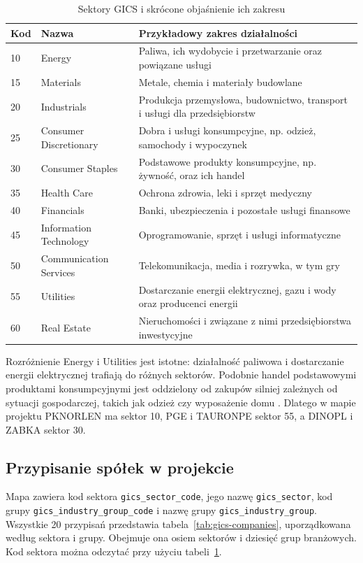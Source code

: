 \documentclass[12pt,a4paper,twoside]{report}
\begin{document}
\begin{table}[htbp]
\centering
\caption{Sektory GICS i skrócone objaśnienie ich zakresu}
\label{tab:gics-sectors}
\small
\begin{tabularx}{\textwidth}{p{0.8cm}XX}
\toprule
Kod & Nazwa & Przykładowy zakres działalności \\
\midrule
10 & Energy & Paliwa, ich wydobycie i przetwarzanie oraz powiązane usługi \\
15 & Materials & Metale, chemia i materiały budowlane \\
20 & Industrials & Produkcja przemysłowa, budownictwo, transport i usługi dla przedsiębiorstw \\
25 & Consumer Discretionary & Dobra i usługi konsumpcyjne, np. odzież, samochody i wypoczynek \\
30 & Consumer Staples & Podstawowe produkty konsumpcyjne, np. żywność, oraz ich handel \\
35 & Health Care & Ochrona zdrowia, leki i sprzęt medyczny \\
40 & Financials & Banki, ubezpieczenia i pozostałe usługi finansowe \\
45 & Information Technology & Oprogramowanie, sprzęt i usługi informatyczne \\
50 & Communication Services & Telekomunikacja, media i rozrywka, w tym gry \\
55 & Utilities & Dostarczanie energii elektrycznej, gazu i wody oraz producenci energii \\
60 & Real Estate & Nieruchomości i związane z nimi przedsiębiorstwa inwestycyjne \\
\bottomrule
\end{tabularx}
\end{table}

Rozróżnienie Energy i Utilities jest istotne: działalność paliwowa i dostarczanie energii elektrycznej trafiają do różnych sektorów. Podobnie handel podstawowymi produktami konsumpcyjnymi jest oddzielony od zakupów silniej zależnych od sytuacji gospodarczej, takich jak odzież czy wyposażenie domu \cite{gicssectors}. Dlatego w mapie projektu PKNORLEN ma sektor 10, PGE i TAURONPE sektor 55, a DINOPL i ZABKA sektor 30.

\subsection{Przypisanie spółek w projekcie}

Mapa zawiera kod sektora \texttt{gics\_sector\_code}, jego nazwę \texttt{gics\_sector}, kod grupy \texttt{gics\_industry\_group\_code} i nazwę grupy \texttt{gics\_industry\_group}. Wszystkie 20 przypisań przedstawia tabela~\ref{tab:gics-companies}, uporządkowana według sektora i grupy. Obejmuje ona osiem sektorów i dziesięć grup branżowych. Kod sektora można odczytać przy użyciu tabeli~\ref{tab:gics-sectors}.
\end{document}
